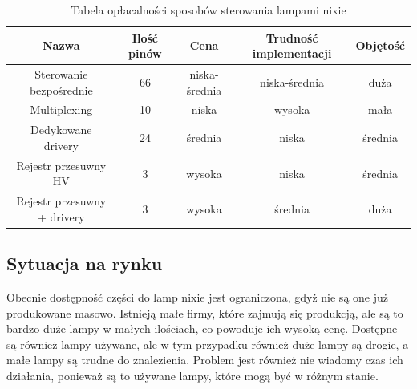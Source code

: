 \documentclass[../main.tex]{subfiles}
\begin{document}
\begin{table}[H]
  \centering
  \begin{tabular}{|c|c|c|c|c|}
    \hline
    Nazwa & Ilość pinów & Cena & Trudność implementacji & Objętość\\
    \hline
    Sterowanie bezpośrednie & 66 & niska-średnia & niska-średnia & duża \\
    \hline
    Multiplexing & 10 &niska & wysoka & mała \\
    \hline
    Dedykowane drivery & 24 &średnia & niska & średnia \\
    \hline
    Rejestr przesuwny HV & 3 &wysoka & niska & średnia \\
    \hline
    Rejestr przesuwny + drivery & 3 & wysoka & średnia & duża \\
    \hline
  \end{tabular}
  \caption{Tabela opłacalności sposobów sterowania lampami nixie}
\end{table}

\subsection{Sytuacja na rynku}
Obecnie dostępność części do lamp nixie jest ograniczona, gdyż nie są one już produkowane masowo. Istnieją małe firmy, które zajmują się produkcją, ale są to bardzo
duże lampy w małych ilościach, co powoduje ich wysoką cenę. Dostępne są również lampy używane, ale w tym przypadku również duże lampy są drogie, a małe lampy są trudne do znalezienia.
Problem jest również nie wiadomy czas ich działania, ponieważ są to używane lampy, które mogą być w różnym stanie.
\end{document}
